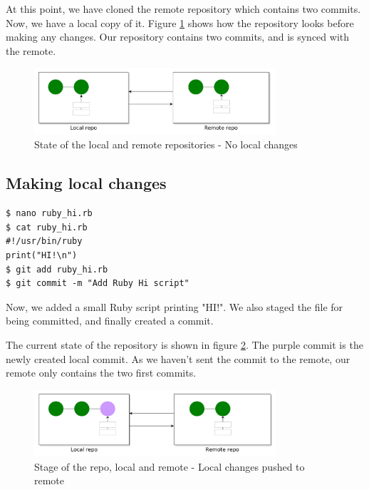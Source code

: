 \documentclass[../main/git_course_main.tex]{subfiles}
\begin{document}
At this point, we have cloned the remote repository which contains two commits. Now, we have a local copy of it.
Figure \ref{fig:original_state} shows how the repository looks before making any changes. Our repository contains two commits, and is synced with the remote.

\begin{figure}[h!]
	\centering
	\includegraphics[width=0.8\textwidth]{../visualizations/chapter5/530_local_remote_synced.pdf}
	\caption{State of the local and remote repositories - No local changes}
	\label{fig:original_state}
\end{figure}

\subsection{Making local changes}

\begin{codebox}
\begin{lstlisting}
$ nano ruby_hi.rb
$ cat ruby_hi.rb
#!/usr/bin/ruby
print("HI!\n")
$ git add ruby_hi.rb
$ git commit -m "Add Ruby Hi script"
\end{lstlisting}
\end{codebox}

Now, we added a small Ruby script printing "HI!". We also staged the file for being committed, and finally created a commit.

The current state of the repository is shown in figure \ref{fig:local_changes}. The purple commit is the newly created local commit. As we haven't sent the commit to the remote, our remote only contains the two first commits.

\begin{figure}[h!]
	\centering
	\includegraphics[width=0.8\textwidth]{../visualizations/chapter5/53_local_changes_made.pdf}
	\caption{Stage of the repo, local and remote - Local changes pushed to remote}
	\label{fig:local_changes}
\end{figure}
\end{document}

